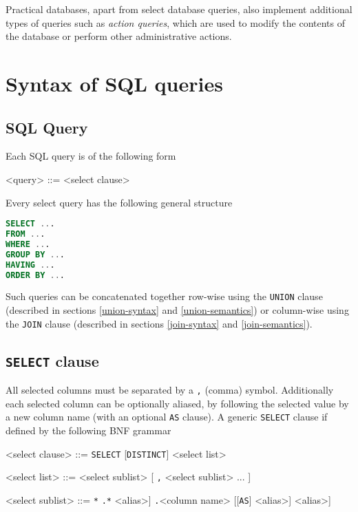 \documentclass[magisterska,en]{pracamgr}
\newcommand{\code}[1]{\texttt{#1}}
\begin{document}
Practical databases, apart from select database queries, also implement additional types of queries such as \emph{action queries}, which are used to modify the contents of the database or perform other administrative actions.

\section{Syntax of SQL queries}

\subsection{SQL Query}

Each SQL query is of the following form
\begin{grammar}
<query> ::= <select clause>     
\end{grammar}
Every select query has the following general structure
\begin{lstlisting}[language=SQL, caption=SQL query structure]
SELECT ...
FROM ...
WHERE ...
GROUP BY ...
HAVING ...
ORDER BY ...
\end{lstlisting}
Such queries can be concatenated together row-wise using the \code{UNION} clause (described in sections \ref{union-syntax} and \ref{union-semantics}) or column-wise using the \code{JOIN} clause (described in sections \ref{join-syntax} and \ref{join-semantics}).

\subsection{\code{SELECT} clause}

All selected columns must be separated by a \code{,} (comma) symbol.
Additionally each selected column can be optionally aliased, by following the selected value by a new column name (with an optional \code{AS} clause). A generic \code{SELECT} clause if defined by the following BNF grammar
\begin{grammar}
<select clause> ::= \code{SELECT} [\code{DISTINCT}] <select list>

<select list> ::= <select sublist> [ { \code{,} <select sublist> }... ]

<select sublist> ::= \code{*} \code{.*} \alt <column name> [[\code{AS}] <alias>] \code{.}<column name> [[\code{AS}] <alias>] \alt <value expression> [[\code{AS}] <alias>]
\end{grammar}
\end{document}
